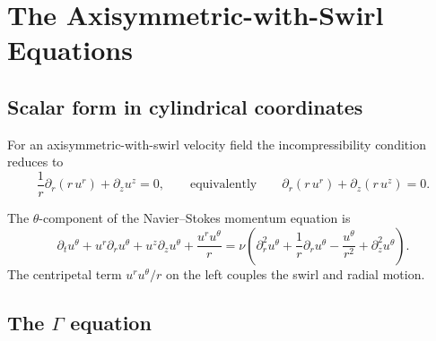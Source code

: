 \documentclass{article}
\theoremstyle{definition}
\theoremstyle{remark}
\begin{document}
\section{The Axisymmetric-with-Swirl Equations}\label{sec:axi}

\subsection{Scalar form in cylindrical coordinates}

For an axisymmetric-with-swirl velocity field the incompressibility
condition reduces to
\begin{equation}\label{eq:incomp}
  \frac{1}{r}\partial_r(r\,u^r) + \partial_z u^z = 0,
  \qquad\text{equivalently}\qquad
  \partial_r(r\,u^r) + \partial_z(r\,u^z) = 0.
\end{equation}

The $\theta$-component of the Navier--Stokes momentum equation is
\begin{equation}\label{eq:utheta}
  \partial_t u^\theta + u^r\partial_r u^\theta + u^z\partial_z u^\theta
  + \frac{u^r u^\theta}{r}
  = \nu\!\left(\partial_r^2 u^\theta + \frac{1}{r}\partial_r u^\theta
    - \frac{u^\theta}{r^2} + \partial_z^2 u^\theta\right).
\end{equation}
The centripetal term $u^r u^\theta/r$ on the left couples the swirl and
radial motion.

\subsection{The \texorpdfstring{$\Gamma$}{Gamma} equation}
\end{document}
